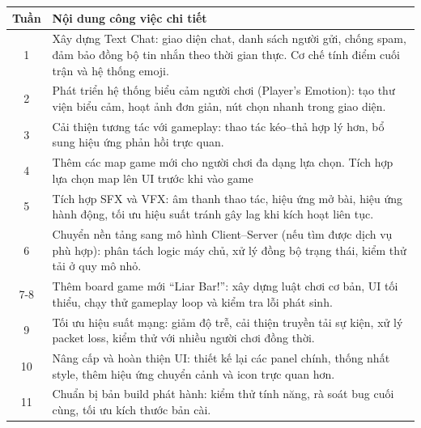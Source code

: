 \begin{table}[H]
\centering
\begin{tabular}{|c|p{11cm}|}
\hline
\textbf{Tuần} & \textbf{Nội dung công việc chi tiết} \\ \hline


1 & Xây dựng Text Chat: giao diện chat, danh sách người gửi, chống spam, đảm bảo đồng bộ tin nhắn theo thời gian thực. Cơ chế tính điểm cuối trận và hệ thống emoji. \\ \hline

2 & Phát triển hệ thống biểu cảm người chơi (Player's Emotion): tạo thư viện biểu cảm, hoạt ảnh đơn giản, nút chọn nhanh trong giao diện. \\ \hline

3 & Cải thiện tương tác với gameplay: thao tác kéo–thả hợp lý hơn, bổ sung hiệu ứng phản hồi trực quan. \\ \hline

4 & Thêm các map game mới cho người chơi đa dạng lựa chọn. Tích hợp lựa chọn map lên UI trước khi vào game\\ \hline

5 & Tích hợp SFX và VFX: âm thanh thao tác, hiệu ứng mở bài, hiệu ứng hành động, tối ưu hiệu suất tránh gây lag khi kích hoạt liên tục. \\ \hline

6 & Chuyển nền tảng sang mô hình Client–Server (nếu tìm được dịch vụ phù hợp): phân tách logic máy chủ, xử lý đồng bộ trạng thái, kiểm thử tải ở quy mô nhỏ. \\ \hline

7-8 & Thêm board game mới “Liar Bar!”: xây dựng luật chơi cơ bản, UI tối thiểu, chạy thử gameplay loop và kiểm tra lỗi phát sinh. \\ \hline

9 & Tối ưu hiệu suất mạng: giảm độ trễ, cải thiện truyền tải sự kiện, xử lý packet loss, kiểm thử với nhiều người chơi đồng thời. \\ \hline

10 & Nâng cấp và hoàn thiện UI: thiết kế lại các panel chính, thống nhất style, thêm hiệu ứng chuyển cảnh và icon trực quan hơn. \\ \hline

11 & Chuẩn bị bản build phát hành: kiểm thử tính năng, rà soát bug cuối cùng, tối ưu kích thước bản cài. \\ \hline


\end{tabular}
\end{table}
